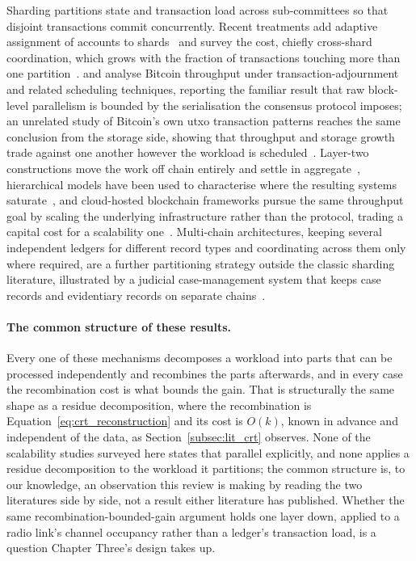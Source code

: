 \documentclass[12pt,a4paper,oneside]{book}
\begin{document}
Sharding partitions state and transaction load across sub-committees so that
disjoint transactions commit concurrently. Recent treatments add adaptive
assignment of accounts to shards~\cite{horvath2025assistedsharding} and survey
the cost, chiefly cross-shard coordination, which grows with the fraction of
transactions touching more than one partition~\cite{anonndscalabilitysolutions}.
\textcite{maiwada2024techniquesimprove} and
\textcite{maiwada2025blockchainscalability} analyse Bitcoin throughput under
transaction-adjournment and related scheduling techniques, reporting the
familiar result that raw block-level parallelism is bounded by the
serialisation the consensus protocol imposes; an unrelated study of Bitcoin's
own \gls{utxo} transaction patterns reaches the same conclusion from the
storage side, showing that throughput and storage growth trade against one
another however the workload is scheduled~\cite{melo2024unlockingblockchain}.
Layer-two constructions move the work off chain entirely and settle in
aggregate~\cite{patel2023blockchainlayer}, hierarchical models have been
used to characterise where the resulting systems
saturate~\cite{sadath2024scalabilityperformance}, and cloud-hosted
blockchain frameworks pursue the same throughput goal by scaling the
underlying infrastructure rather than the protocol, trading a capital cost
for a scalability
one~\cite{anonndoptimizedcloud}. Multi-chain architectures, keeping
several independent ledgers for different record types and coordinating
across them only where required, are a further partitioning strategy
outside the classic sharding literature, illustrated by a judicial
case-management system that keeps case records and evidentiary records on
separate chains~\cite{alyas2025multiblockchain}.

\paragraph{The common structure of these results.}

Every one of these mechanisms decomposes a workload into parts that can be
processed independently and recombines the parts afterwards, and in every case
the recombination cost is what bounds the gain. That is structurally the same
shape as a residue decomposition, where the recombination is
Equation~\ref{eq:crt_reconstruction} and its cost is $O(k)$, known in advance
and independent of the data, as Section~\ref{subsec:lit_crt} observes. None of
the scalability studies surveyed here states that parallel explicitly, and
none applies a residue decomposition to the workload it partitions; the
common structure is, to our knowledge, an observation this review is making
by reading the two literatures side by side, not a result either literature
has published. Whether the same recombination-bounded-gain argument holds one
layer down, applied to a radio link's channel occupancy rather than a
ledger's transaction load, is a question Chapter Three's design takes up.
\end{document}
